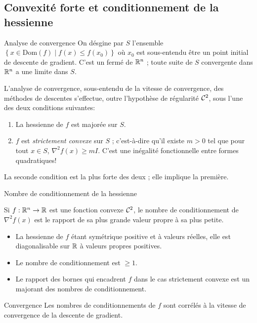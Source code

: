\documentclass[aspectratio = 169]{beamer}
\begin{document}
\subsection{Convexité forte et conditionnement de la hessienne}

\begin{frame}{Analyse de convergence}
  On désgine par $S$ l'ensemble
  $\left\{ x \in \mathrm{Dom}(f) \mid f(x) \leq f(x_0) \right\}$ où
  $x_0$ est sous-entendu être un point initial de descente de
  gradient. C'est un fermé de $\mathbb{R}^n$ ; toute suite de $S$ convergente
  dans $\mathbb{R}^n$ a une limite dans $S$. \pause

  L'analyse de convergence, sous-entendu de la vitesse de
  convergence, des méthodes de descentes s'effectue, outre l'hypothèse
  de régularité $\mathcal{C}^2$, sous l'une des deux conditions suivantes:
  \begin{enumerate}
  \item<2-> La hessienne de $f$ est majorée sur $S$.
  \item<3-> $f$ est \emph{strictement convexe} sur $S$ ; c'est-à-dire
    qu'il existe $m > 0$ tel que pour tout $x \in S$,
    $\nabla^2f(x) \geq m I$. C'est une inégalité
        fonctionnelle entre formes quadratiques!
  \end{enumerate}
  \pause[4] La seconde condition est la plus forte des deux ; elle
  implique la première.
\end{frame}

\begin{frame}{Nombre de conditionnement de la hessienne}
  \begin{defn}
    Si $f : \mathbb{R}^n \to \mathbb{R}$ est une fonction convexe $\mathcal{C}^2$, le
    nombre de conditionnement de $\nabla^2f(x)$ est le rapport de sa
    plus grande valeur propre à sa plus petite.
  \end{defn}
  \begin{itemize}
  \item<2-> La hessienne de $f$ étant symétrique positive et à
    valeurs réelles, elle est diagonalisable sur $\mathbb{R}$ à valeurs
    propres positives.
  \item<3-> Le nombre de conditionnement est $\geq 1$.
  \item<4-> Le rapport des bornes qui encadrent $f$ dans le cas
    strictement convexe est un majorant des nombres de
    conditionnement.
  \end{itemize}
  \pause[5]
  \begin{alertblock}{Convergence}
    Les nombres de conditionnements de $f$ sont corrélés à la vitesse
    de convergence de la descente de gradient.
  \end{alertblock}
\end{frame}
\end{document}
